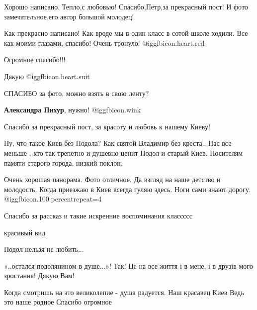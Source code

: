 \begin{itemize}

Хорошо написано.
Тепло,с любовью!
Спасибо,Петр,за прекрасный пост!
И фото замечательное,его автор большой молодец!


Как прекрасно написано! Как вроде мы в один класс в сотой школе ходили. Все как
моими глазами, спасибо! Очень тронуло! @igg{fbicon.heart.red}

Огромное спасибо!!!

Дякую @igg{fbicon.heart.suit}

СПАСИБО за фото, можно взять в свою ленту?

\textbf{Александра Пихур}, нужно! @igg{fbicon.wink} 

Спасибо за прекрасный пост, за красоту и любовь к нашему Киеву!


Ну, что такое Киев без Подола? Как святой Владимир без креста.. Нас все меньше
, кто так трепетно и душевно ценит Подол и старый Киев. Носителям памяти
старого города, низкий поклон.


Очень хорошая панорама. Фото отличное. Да взгляд на наше детство и молодость.
Когда приезжаю в Киев всегда гуляю здесь. Ноги сами знают дорогу.  @igg{fbicon.100.percent}{repeat=4} 

Спасибо за рассказ и такие искренние воспоминания классссс

красивый вид


Подол нельзя не любить...


«..остался подолянином в душе...»! Так! Це на все життя і в мене, і в друзів
мого зростання! Дякую Вам!



Когда смотришь на это великолепие - душа радуется. Наш красавец Киев Ведь это
наше родное Спасибо огромное


\end{itemize} %
